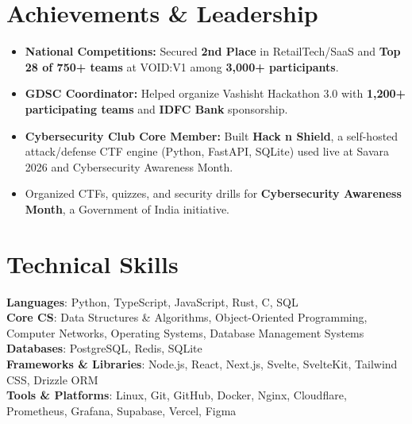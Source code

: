 \documentclass[letterpaper,10pt]{article}
\newcommand{\resumeItem}[1]{\item\small{{#1 \vspace{-2pt}}}}
\begin{document}
\section{Achievements \& Leadership}
\begin{itemize}[leftmargin=0.15in, itemsep=-1pt, topsep=2pt]
  \resumeItem{\textbf{National Competitions:} Secured \textbf{2nd Place} in RetailTech/SaaS and \textbf{Top 28 of 750+ teams} at VOID:V1 among \textbf{3,000+ participants}.}
  \resumeItem{\textbf{GDSC Coordinator:} Helped organize Vashisht Hackathon 3.0 with \textbf{1,200+ participating teams} and \textbf{IDFC Bank} sponsorship.}
  \resumeItem{\textbf{Cybersecurity Club Core Member:} Built \textbf{Hack n Shield}, a self-hosted attack/defense CTF engine (Python, FastAPI, SQLite) used live at Savara 2026 and Cybersecurity Awareness Month.}
  \resumeItem{Organized CTFs, quizzes, and security drills for \textbf{Cybersecurity Awareness Month}, a Government of India initiative.}
\end{itemize}\vspace{-4pt}

\section{Technical Skills}
\begin{itemize}[leftmargin=0.15in, label={}]
\small{
  \item{
    \textbf{Languages}: Python, TypeScript, JavaScript, Rust, C, SQL \\
    \textbf{Core CS}: Data Structures \& Algorithms, Object-Oriented Programming, Computer Networks, Operating Systems, Database Management Systems \\
    \textbf{Databases}: PostgreSQL, Redis, SQLite \\
    \textbf{Frameworks \& Libraries}: Node.js, React, Next.js, Svelte, SvelteKit, Tailwind CSS, Drizzle ORM \\
    \textbf{Tools \& Platforms}: Linux, Git, GitHub, Docker, Nginx, Cloudflare, Prometheus, Grafana, Supabase, Vercel, Figma
  }
}
\end{itemize}
\end{document}
